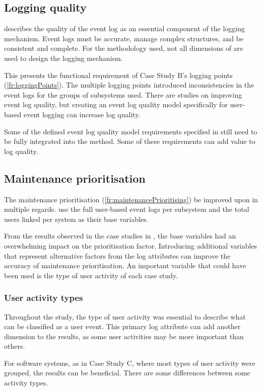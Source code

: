 \subsection{Logging quality}
 describes the quality of the event log as an essential component of the logging mechanism. Event logs must be accurate, manage complex structures, and be consistent and complete. For the methodology used, not all dimensions of  are used to design the logging mechanism.\par This presents the functional requirement of Case Study B's logging points (\ref{fr:loggingPoints}). The multiple logging points introduced inconsistencies in the event logs for the groups of subsystems used. There are studies on improving event log quality, but creating an event log quality model specifically for user-based event logging can increase log quality. \par Some of the defined event log quality model requirements specified in  still need to be fully integrated into the method. Some of these requirements can add value to log quality.

\subsection{Maintenance prioritisation}
The maintenance prioritisation (\ref{fr:maintenancePrioritising}) be improved upon in multiple regards.  use the full user-based event logs per subsystem and the total users linked per system as their base variables. \par From the results observed in the case studies in , the base variables had an overwhelming impact on the prioritisation factor. Introducing additional variables that represent alternative factors from the log attributes can improve the accuracy of maintenance prioritisation. An important variable that could have been used is the type of user activity of each case study.

\subsubsection{User activity types}
Throughout the study, the type of user activity was essential to describe what can be classified as a user event. This primary log attribute can add another dimension to the results, as some user activities may be more important than others. \par For software systems, as in Case Study C, where most types of user activity were grouped, the results can be beneficial. There are some differences between some activity types. 

